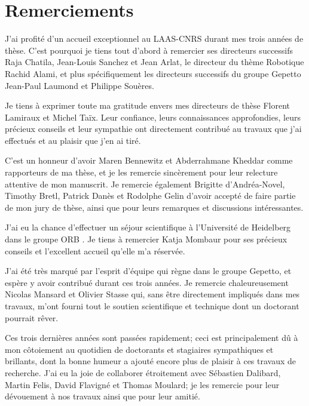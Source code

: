 \chapter*{Remerciements}

J'ai profit\'e d'un accueil exceptionnel au LAAS-CNRS durant mes trois
ann\'ees de th\`ese. C'est pourquoi je tiens tout d'abord \`a
remercier ses directeurs successifs Raja Chatila, Jean-Louis Sanchez
et Jean Arlat, le directeur du th\`eme Robotique Rachid Alami, et plus
sp\'ecifiquement les directeurs successifs du groupe Gepetto Jean-Paul
Laumond et Philippe Sou\`eres.

Je tiens \`a exprimer toute ma gratitude envers mes directeurs de
th\`ese Florent Lamiraux et Michel Ta\"ix. Leur confiance, leurs
connaissances approfondies, leurs pr\'ecieux conseils et leur
sympathie ont directement contribu\'e au travaux que j'ai effectu\'es
et au plaisir que j'en ai tir\'e.

C'est un honneur d'avoir Maren Bennewitz et Abderrahmane Kheddar comme
rapporteurs de ma th\`ese, et je les remercie sinc\`erement pour leur
relecture attentive de mon manuscrit. Je remercie \'egalement Brigitte
d'Andr\'ea-Novel, Timothy Bretl, Patrick Dan\`es et Rodolphe Gelin
d'avoir accept\'e de faire partie de mon jury de th\`ese, ainsi que
pour leurs remarques et discussions int\'eressantes.

J'ai eu la chance d'effectuer un s\'ejour scientifique \`a
l'Universit\'e de Heidelberg dans le groupe ORB . Je tiens \`a
remercier Katja Mombaur pour ses pr\'ecieux conseils et l'excellent
accueil qu'elle m'a r\'eserv\'ee.

J'ai \'et\'e tr\`es marqu\'e par l'esprit d'\'equipe qui r\`egne dans
le groupe Gepetto, et esp\`ere y avoir contribu\'e durant ces trois
ann\'ees. Je remercie chaleureusement Nicolas Mansard et Olivier
Stasse qui, sans \^etre directement impliqu\'es dans mes travaux,
m'ont fourni tout le soutien scientifique et technique dont un
doctorant pourrait r\^ever.

\bigskip

Ces trois derni\`eres ann\'ees sont pass\'ees rapidement; ceci est
principalement d\^u \`a mon c\^otoiement au quotidien de doctorants et
stagiaires sympathiques et brillants, dont la bonne humeur a ajout\'e
encore plus de plaisir \`a ces travaux de recherche. J'ai eu la joie
de collaborer \'etroitement avec S\'ebastien Dalibard, Martin Felis,
David Flavign\'e et Thomas Moulard; je les remercie pour leur
d\'evouement \`a nos travaux ainsi que pour leur amiti\'e.

